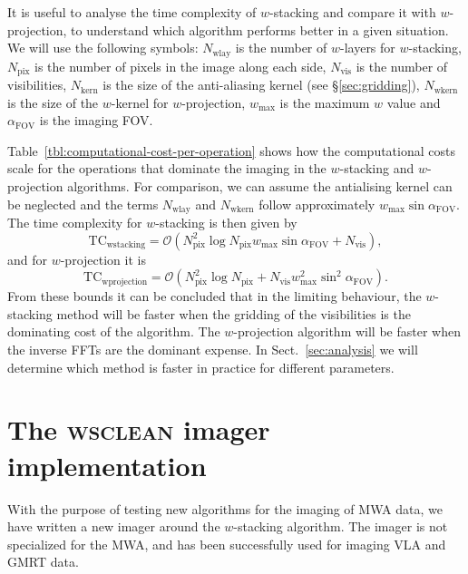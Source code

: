 \documentclass[useAMS,usenatbib]{mn2e}
\begin{document}
It is useful to analyse the time complexity of $w$-stacking and compare it with $w$-projection, to understand which algorithm performs better in a given situation. We will use the following symbols: $N_\textrm{wlay}$ is the number of $w$-layers for $w$-stacking, $N_\textrm{pix}$ is the number of pixels in the image along each side, $N_\textrm{vis}$ is the number of visibilities, $N_\textrm{kern}$ is the size of the anti-aliasing kernel (see \S\ref{sec:gridding}), $N_\textrm{wkern}$ is the size of the $w$-kernel for $w$-projection, $w_{\max}$ is the maximum $w$ value and $\alpha_\textrm{FOV}$ is the imaging FOV.

Table~\ref{tbl:computational-cost-per-operation} shows how the computational costs scale for the operations that dominate the imaging in the $w$-stacking and $w$-projection algorithms. For comparison, we can assume the antialising kernel can be neglected and the terms $N_\textrm{wlay}$ and $N_\textrm{wkern}$ follow approximately $w_{\max} \sin \alpha_\textrm{FOV}$. The time complexity for $w$-stacking is then given by
\begin{equation}
\textrm{TC}_\textrm{wstacking}=\mathcal{O}\left(N^2_\textrm{pix} \log N_\textrm{pix} w_{\max} \sin \alpha_\textrm{FOV}+ N_\textrm{vis} \right),
\end{equation}
and for $w$-projection it is
\begin{equation}
\textrm{TC}_\textrm{wprojection}=\mathcal{O}\left(N^2_\textrm{pix} \log N_\textrm{pix} + N_\textrm{vis} w_{\max}^2 \sin^2 \alpha_\textrm{FOV}\right).
\end{equation}
From these bounds it can be concluded that in the limiting behaviour, the $w$-stacking method will be faster when the gridding of the visibilities is the dominating cost of the algorithm. The $w$-projection algorithm will be faster when the inverse FFTs are the dominant expense. In Sect.~\ref{sec:analysis} we will determine which method is faster in practice for different parameters.

\section{The \textsc{wsclean} imager implementation} \label{sec:implementation}
With the purpose of testing new algorithms for the imaging of MWA data, we have written a new imager around the $w$-stacking algorithm. The imager is not specialized for the MWA, and has been successfully used for imaging VLA and GMRT data.
\end{document}

